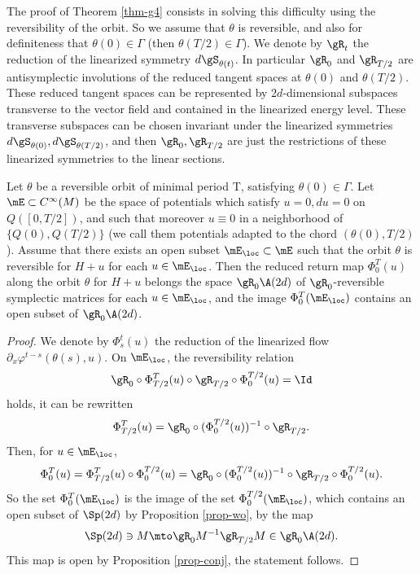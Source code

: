 The proof of Theorem \ref{thm-g4} consists in solving this difficulty using the reversibility of the orbit.
So we assume that $\theta$ is reversible, and also for definiteness that $\theta(0)\in \Gamma$
(then $\theta(T/2)\in \Gamma$).
We denote by $\gR_t$ the reduction of the linearized symmetry $d\gS_{\theta(t)}$.
In particular $\gR_0$ and $\gR_{T/2}$ are antisymplectic involutions of the reduced tangent spaces at $\theta(0)$
and $\theta(T/2)$. These reduced tangent spaces can be represented by $2d$\nobreakdash-di\-men\-sional subspaces transverse to the vector field
and contained in the linearized energy level. These transverse subspaces can be chosen invariant under the linearized symmetries
$d\gS_{\theta(0)}, d\gS_{\theta(T/2)} $, and then $\gR_0, \gR_{T/2}$ are just the restrictions of these linearized
symmetries to the linear sections.

\begin{prop}\label{prop-cr}
Let $\theta$ be a reversible orbit of minimal period T, satisfying $\theta(0)\in \Gamma$.
Let
$\mE\subset C^{\infty}(M)$ be the space of potentials which satisfy $u=0, du=0$ on $Q([0,T/2])$, and such that
moreover $u\equiv 0$ in a neighborhood of $\{Q(0), Q(T/2)\}$ (we call them potentials adapted to the chord $(\theta(0), T/2)$).
Assume that there exists an open subset $\mE_{\loc}\subset \mE$ such that the orbit $\theta$ is reversible for $H+u$ for each
$u\in \mE_{\loc}$.
Then the reduced return map $\Phi_0^T(u)$ along the orbit $\theta$ for $H+u$ belongs the space $\gR_0\A(2d)$ of $\gR_0$-reversible symplectic matrices for each
$u\in \mE_{\loc}$, and the image $\Phi_0^T(\mE_{\loc})$ contains an open subset of $\gR_0\A(2d)$.
\end{prop}

\begin{proof}
We denote by $\Phi_s^t(u)$ the reduction of the linearized flow $\partial_x \varphi^{t-s}(\theta(s),u)$.
On $\mE_{\loc}$, the reversibility relation
\[
\gR_0\circ \Phi_{T/2}^T(u)\circ \gR_{T/2}\circ \Phi_0^{T/2}(u)=\Id
\]
holds, it can be rewritten
\[
\Phi^{T}_{T/2}(u)=\gR_0\circ (\Phi_0^{T/2}(u))^{-1}\circ\gR_{T/2}.
\]
Then, for $u\in \mE_{\loc}$,
\[
\Phi_0^T(u)= \Phi^{T}_{T/2}(u)\circ \Phi_0^{T/2}(u)
=\gR_0\circ (\Phi_0^{T/2}(u))^{-1}\circ\gR_{T/2}\circ \Phi_0^{T/2}(u).
\]
So the set
$ \Phi_0^T(\mE_{\loc})
$
is the image
of the set $\Phi_0^{T/2}(\mE_{\loc})$, which contains an open subset of $\Sp(2d)$ by Proposition \ref{prop-wo},
by the map
\[
\Sp(2d)\ni M\mto \gR_0 M^{-1}\gR_{T/2} M \in \gR_0\A(2d).
\]
This map is open by Proposition \ref{prop-conj}, the statement follows.
\end{proof}

